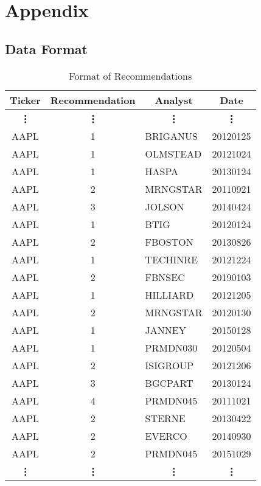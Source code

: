 \chapter{Appendix}

\section{Data Format}\label{selectedsecurities}
\begin{table}[H]
\centering
\begin{tabular}{@{}ccll@{}}
\toprule\toprule
\multicolumn{1}{c}{Ticker} & \multicolumn{1}{c}{Recommendation} & \multicolumn{1}{c}{Analyst} & \multicolumn{1}{c}{Date} \\ \midrule
\multicolumn{1}{c}{\bf\vdots} & \multicolumn{1}{c}{\bf\vdots} & \multicolumn{1}{c}{\bf\vdots} & \multicolumn{1}{c}{\bf\vdots}  \\
AAPL   & 1      & BRIGANUS   & 20120125 \\
AAPL   & 1      & OLMSTEAD   & 20121024 \\
AAPL   & 1      & HASPA      & 20130124 \\
AAPL   & 2      & MRNGSTAR   & 20110921 \\
AAPL   & 3      & JOLSON     & 20140424 \\
AAPL   & 1      & BTIG       & 20120124 \\
AAPL   & 2      & FBOSTON    & 20130826 \\
AAPL   & 1      & TECHINRE   & 20121224 \\
AAPL   & 2      & FBNSEC     & 20190103 \\
AAPL   & 1      & HILLIARD   & 20121205 \\
AAPL   & 2      & MRNGSTAR   & 20120130 \\
AAPL   & 1      & JANNEY     & 20150128 \\
AAPL   & 1      & PRMDN030   & 20120504 \\
AAPL   & 2      & ISIGROUP   & 20121206 \\
AAPL   & 3      & BGCPART    & 20130124 \\
AAPL   & 4      & PRMDN045   & 20111021 \\
AAPL   & 2      & STERNE     & 20130422 \\
AAPL   & 2      & EVERCO     & 20140930 \\
AAPL   & 2      & PRMDN045   & 20151029 \\ 
\multicolumn{1}{c}{\bf\vdots} & \multicolumn{1}{c}{\bf\vdots} & \multicolumn{1}{c}{\bf\vdots} & \multicolumn{1}{c}{\bf\vdots}  \\\bottomrule
\end{tabular}
\caption{Format of Recommendations}
\label{tab:recommendations}
\end{table}

